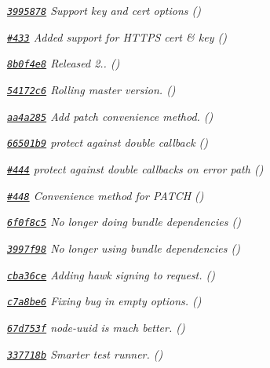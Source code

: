 \begin{DoxyItemize}
\item {\itshape \href{https://github.com/mikeal/request/commit/3995878d9fff18a8707f27ffeb4ed6401086adce}{\tt 3995878} Support {\ttfamily key} and {\ttfamily cert} options ()}
\item {\itshape \href{https://github.com/mikeal/request/pull/433}{\tt \#433} Added support for H\+T\+T\+P\+S cert \& key ()}
\item {\itshape \href{https://github.com/mikeal/request/commit/8b0f4e8fba33d578a891218201d87e3316ea9844}{\tt 8b0f4e8} Released 2.. ()}
\item {\itshape \href{https://github.com/mikeal/request/commit/54172c68cab8360372e1e64e3fa14902662950bd}{\tt 54172c6} Rolling master version. ()}
\item {\itshape \href{https://github.com/mikeal/request/commit/aa4a28586354901b0c9b298a0aa79abb5ed175af}{\tt aa4a285} Add patch convenience method. ()}
\item {\itshape \href{https://github.com/mikeal/request/commit/66501b9872abc9a2065430cd5ed4a34dd45c8bee}{\tt 66501b9} protect against double callback ()}
\item {\itshape \href{https://github.com/mikeal/request/pull/444}{\tt \#444} protect against double callbacks on error path ()}
\item {\itshape \href{https://github.com/mikeal/request/pull/448}{\tt \#448} Convenience method for P\+A\+T\+C\+H ()}
\item {\itshape \href{https://github.com/mikeal/request/commit/6f0f8c5ee2b2fdc7118804664c2215fe9cb5a2f2}{\tt 6f0f8c5} No longer doing bundle dependencies ()}
\item {\itshape \href{https://github.com/mikeal/request/commit/3997f980722241c18454a00aeeda07d701c27a8f}{\tt 3997f98} No longer using bundle dependencies ()}
\item {\itshape \href{https://github.com/mikeal/request/commit/cba36ce64e68bd26e230b65f81256776ac66e686}{\tt cba36ce} Adding hawk signing to request. ()}
\item {\itshape \href{https://github.com/mikeal/request/commit/c7a8be6d174eff05a9cb2fda987979e475d8543f}{\tt c7a8be6} Fixing bug in empty options. ()}
\item {\itshape \href{https://github.com/mikeal/request/commit/67d753fec99fa1f5a3b35ec0bbbc98896418d86c}{\tt 67d753f} node-\/uuid is much better. ()}
\item {\itshape \href{https://github.com/mikeal/request/commit/337718baa08cafb3e706d275fd7344a3c92363bb}{\tt 337718b} Smarter test runner. ()}

\end{DoxyItemize}
